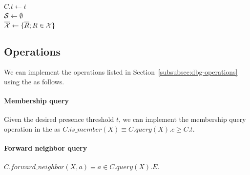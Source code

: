 \begin{algorithm}
	\caption{$C.\mathit{construct}(\readset, t, n)$}\label{alg:dbcm-construction}
  $C.t \gets t$\\
  $\strsetname{S} \gets \emptyset$\\
  $\overline{\readset} \gets \{\overline{R}; R \in \readset \}$\\
\end{algorithm}

\subsection{\dBCM Operations}
\label{subsubsec:dbcm-operations}

We can implement the operations listed in Section~\ref{subsubsec:dbg-operations} using the \dBCM as follows.

\paragraph*{Membership query} Given the desired presence threshold $t$, we can implement the membership query operation in the \dBCM as $C.\mathit{is\_member}(X) \equiv C.\mathit{query}(X).c \geq C.t$.

\paragraph*{Forward neighbor query} $C.\mathit{forward\_neighbor}(X, a) \equiv a\in C.\mathit{query}(X).E$.


